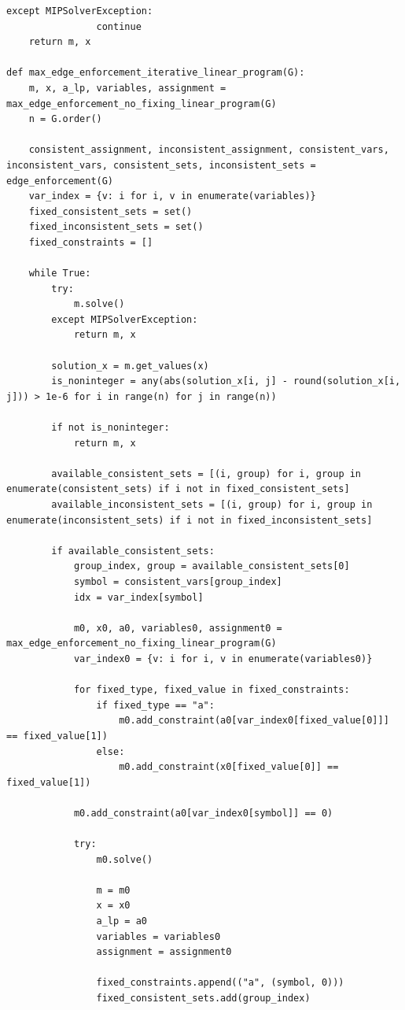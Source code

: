 \begin{lstlisting}[style=python, caption={Max Edge Enforcment Linear Program.}, label={lst::max_edge_enforcement_linear_program}]
            except MIPSolverException:
                continue
    return m, x

def max_edge_enforcement_iterative_linear_program(G):
    m, x, a_lp, variables, assignment = max_edge_enforcement_no_fixing_linear_program(G)
    n = G.order()

    consistent_assignment, inconsistent_assignment, consistent_vars, inconsistent_vars, consistent_sets, inconsistent_sets = edge_enforcement(G)
    var_index = {v: i for i, v in enumerate(variables)}
    fixed_consistent_sets = set()
    fixed_inconsistent_sets = set()
    fixed_constraints = []

    while True:
        try:
            m.solve()
        except MIPSolverException:
            return m, x

        solution_x = m.get_values(x)
        is_noninteger = any(abs(solution_x[i, j] - round(solution_x[i, j])) > 1e-6 for i in range(n) for j in range(n))

        if not is_noninteger:
            return m, x

        available_consistent_sets = [(i, group) for i, group in enumerate(consistent_sets) if i not in fixed_consistent_sets]
        available_inconsistent_sets = [(i, group) for i, group in enumerate(inconsistent_sets) if i not in fixed_inconsistent_sets]

        if available_consistent_sets:
            group_index, group = available_consistent_sets[0]
            symbol = consistent_vars[group_index]
            idx = var_index[symbol]

            m0, x0, a0, variables0, assignment0 = max_edge_enforcement_no_fixing_linear_program(G)
            var_index0 = {v: i for i, v in enumerate(variables0)}

            for fixed_type, fixed_value in fixed_constraints:
                if fixed_type == "a":
                    m0.add_constraint(a0[var_index0[fixed_value[0]]] == fixed_value[1])
                else:
                    m0.add_constraint(x0[fixed_value[0]] == fixed_value[1])

            m0.add_constraint(a0[var_index0[symbol]] == 0)

            try:
                m0.solve()

                m = m0
                x = x0
                a_lp = a0
                variables = variables0
                assignment = assignment0

                fixed_constraints.append(("a", (symbol, 0)))
                fixed_consistent_sets.add(group_index)


\end{lstlisting}
